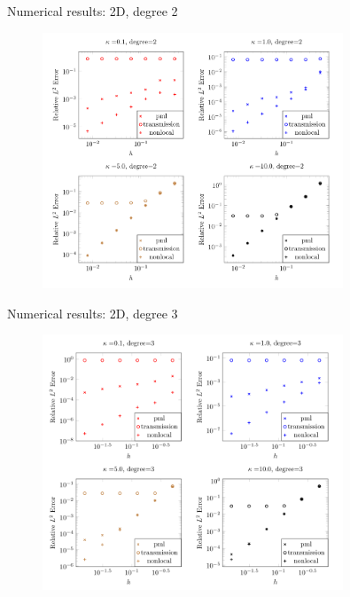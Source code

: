 \documentclass{beamer}
\begin{document}
\begin{frame}{Numerical results: 2D, degree 2}
    \begin{figure}[ht]
    \begin{center}
        \includegraphics[width=0.8\textwidth]{images/degree-2-accuracy.png}
    \end{center}
    \end{figure}
\end{frame}
\begin{frame}{Numerical results: 2D, degree 3}
    \begin{figure}[ht]
    \begin{center}
        \includegraphics[width=0.8\textwidth]{images/degree-3-accuracy.png}
    \end{center}
    \end{figure}
\end{frame}
\end{document}

